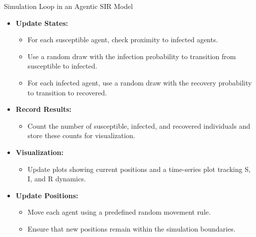 \begin{frame}{Simulation Loop in an Agentic SIR Model}
\footnotesize
\begin{itemize}

    \item \textbf{Update States:}
    \begin{itemize}
    \footnotesize
        \item For each susceptible agent, check proximity to infected agents.
        \item Use a random draw with the infection probability to transition from susceptible to infected.
        \item For each infected agent, use a random draw with the recovery probability to transition to recovered.
    \end{itemize}
    \item \textbf{Record Results:}
    \begin{itemize}
    \footnotesize
        \item Count the number of susceptible, infected, and recovered individuals and store these counts for visualization.
    \end{itemize}
    \item \textbf{Visualization:}
    \begin{itemize}
    \footnotesize
        \item Update  plots showing current positions and a time-series plot tracking S, I, and R dynamics.
    \end{itemize}
    \item \textbf{Update Positions:}
    \begin{itemize}
    \footnotesize
        \item Move each agent using a predefined random movement rule.
        \item Ensure that new positions remain within the simulation boundaries.
    \end{itemize}
\end{itemize}
\end{frame}
